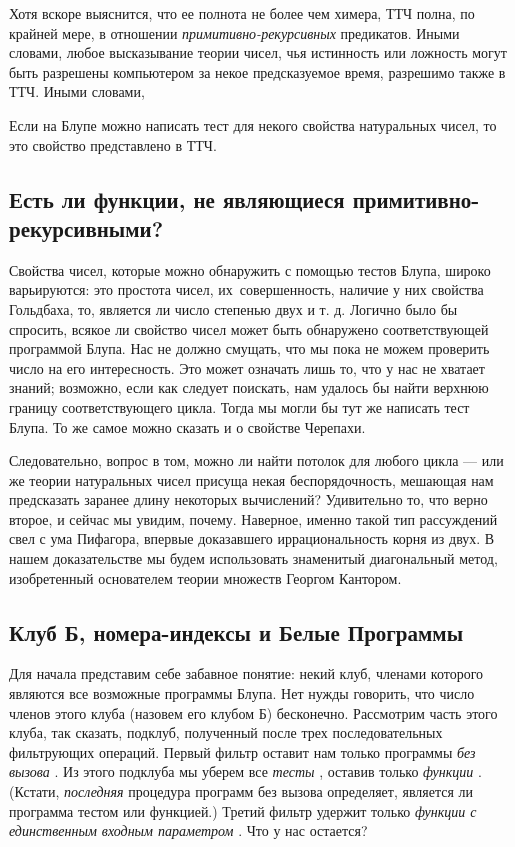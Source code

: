 \documentclass[../main.tex]{subfiles}
\begin{document}
Хотя вскоре выяснится, что ее полнота не более чем химера, ТТЧ полна, по крайней мере, в отношении \emph{примитивно-рекурсивных} предикатов. Иными словами, любое высказывание теории чисел, чья истинность или ложность могут быть разрешены компьютером за некое предсказуемое время, разрешимо также в ТТЧ. Иными словами,

Если на Блупе можно написать тест для некого свойства натуральных чисел, то это свойство представлено в ТТЧ.


\subsection{Есть ли функции, не являющиеся примитивно-рекурсивными?}

Свойства чисел, которые можно обнаружить с помощью тестов Блупа, широко варьируются: это простота чисел, их~совершенность, наличие у них свойства Гольдбаха, то, является ли число степенью двух и т. д. Логично было бы спросить, всякое ли свойство чисел может быть обнаружено соответствующей программой Блупа. Нас не должно смущать, что мы пока не можем проверить число на его интересность. Это может означать лишь то, что у нас не хватает знаний; возможно, если как следует поискать, нам удалось бы найти верхнюю границу соответствующего цикла. Тогда мы могли бы тут же написать тест Блупа. То же самое можно сказать и о свойстве Черепахи.

Следовательно, вопрос в том, можно ли найти потолок для любого цикла --- или же теории натуральных чисел присуща некая беспорядочность, мешающая нам предсказать заранее длину некоторых вычислений? Удивительно то, что верно второе, и сейчас мы увидим, почему. Наверное, именно такой тип рассуждений свел с ума Пифагора, впервые доказавшего иррациональность корня из двух. В нашем доказательстве мы будем использовать знаменитый диагональный метод, изобретенный основателем теории множеств Георгом Кантором.


\subsection{Клуб Б, номера-индексы и Белые Программы}

Для начала представим себе забавное понятие: некий клуб, членами которого являются все возможные программы Блупа. Нет нужды говорить, что число членов этого клуба (назовем его клубом Б) бесконечно. Рассмотрим часть этого клуба, так сказать, подклуб, полученный после трех последовательных фильтрующих операций. Первый фильтр оставит нам только программы \emph{без вызова} . Из этого подклуба мы уберем все \emph{тесты} , оставив только \emph{функции} . (Кстати, \emph{последняя} процедура программ без вызова определяет, является ли программа тестом или функцией.) Третий фильтр удержит только \emph{функции с единственным входным параметром} . Что у нас остается?
\end{document}
